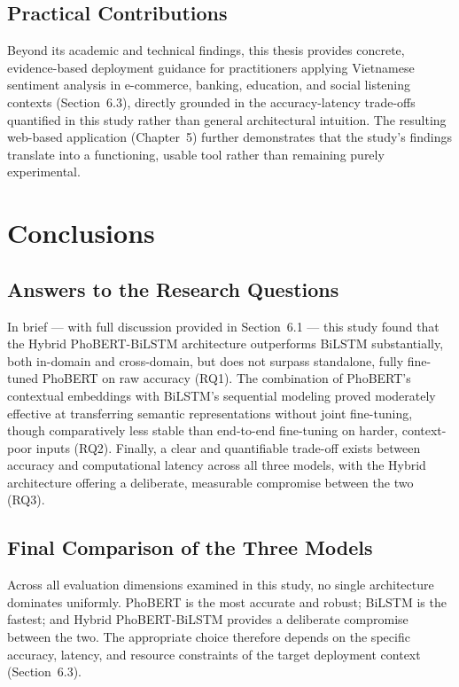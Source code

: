 \documentclass[12pt]{report} %
\begin{document}
\subsection{Practical Contributions}
Beyond its academic and technical findings, this thesis provides concrete, evidence-based deployment guidance for practitioners applying Vietnamese sentiment analysis in e-commerce, banking, education, and social listening contexts (Section~6.3), directly grounded in the accuracy-latency trade-offs quantified in this study rather than general architectural intuition. The resulting web-based application (Chapter~5) further demonstrates that the study's findings translate into a functioning, usable tool rather than remaining purely experimental.

\section{Conclusions}

\subsection{Answers to the Research Questions}
In brief --- with full discussion provided in Section~6.1 --- this study found that the Hybrid PhoBERT-BiLSTM architecture outperforms BiLSTM substantially, both in-domain and cross-domain, but does not surpass standalone, fully fine-tuned PhoBERT on raw accuracy (RQ1). The combination of PhoBERT's contextual embeddings with BiLSTM's sequential modeling proved moderately effective at transferring semantic representations without joint fine-tuning, though comparatively less stable than end-to-end fine-tuning on harder, context-poor inputs (RQ2). Finally, a clear and quantifiable trade-off exists between accuracy and computational latency across all three models, with the Hybrid architecture offering a deliberate, measurable compromise between the two (RQ3).

\subsection{Final Comparison of the Three Models}
Across all evaluation dimensions examined in this study, no single architecture dominates uniformly. PhoBERT is the most accurate and robust; BiLSTM is the fastest; and Hybrid PhoBERT-BiLSTM provides a deliberate compromise between the two. The appropriate choice therefore depends on the specific accuracy, latency, and resource constraints of the target deployment context (Section~6.3).
\end{document}
